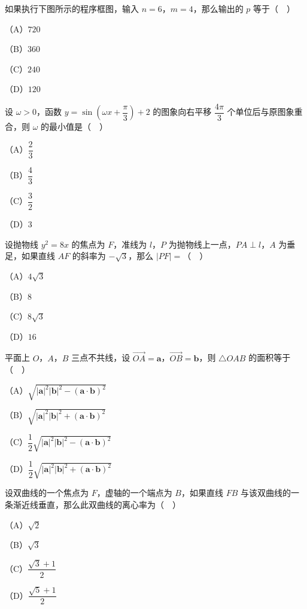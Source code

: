\begin{question}
如果执行下图所示的程序框图，输入 $n=6$，$m=4$，那么输出的 $p$ 等于（　）

（A）$720$

（B）$360$

（C）$240$

（D）$120$
\nopagebreak[4]
\begin{center}\end{center}
\nopagebreak[4]
\end{question}
\endgroup
\begin{question}
设 $\omega>0$，函数 $y=\sin\left(\omega x+\dfrac{\pi}{3}\right)+2$ 的图象向右平移 $\dfrac{4\pi}{3}$ 个单位后与原图象重合，则 $\omega$ 的最小值是（　）

（A）$\dfrac23$

（B）$\dfrac43$

（C）$\dfrac32$

（D）$3$

\end{question}
\begin{question}
设抛物线 $y^2=8x$ 的焦点为 $F$，准线为 $l$，$P$ 为抛物线上一点，$PA\perp l$，$A$ 为垂足，如果直线 $AF$ 的斜率为 $-\sqrt3$，那么 $|PF|=$（　）

（A）$4\sqrt3$

（B）$8$

（C）$8\sqrt3$

（D）$16$

\end{question}
\begin{question}
平面上 $O$，$A$，$B$ 三点不共线，设 $\overrightarrow{OA}=\boldsymbol a$，$\overrightarrow{OB}=\boldsymbol b$，则 $\triangle OAB$ 的面积等于（　）

（A）$\sqrt{|\boldsymbol a|^2|\boldsymbol b|^2-(\boldsymbol a\cdot\boldsymbol b)^2}$

（B）$\sqrt{|\boldsymbol a|^2|\boldsymbol b|^2+(\boldsymbol a\cdot\boldsymbol b)^2}$

（C）$\dfrac12\sqrt{|\boldsymbol a|^2|\boldsymbol b|^2-(\boldsymbol a\cdot\boldsymbol b)^2}$

（D）$\dfrac12\sqrt{|\boldsymbol a|^2|\boldsymbol b|^2+(\boldsymbol a\cdot\boldsymbol b)^2}$

\end{question}
\begin{question}
设双曲线的一个焦点为 $F$，虚轴的一个端点为 $B$，如果直线 $FB$ 与该双曲线的一条渐近线垂直，那么此双曲线的离心率为（　）

（A）$\sqrt2$

（B）$\sqrt3$

（C）$\dfrac{\sqrt3+1}{2}$

（D）$\dfrac{\sqrt5+1}{2}$

\end{question}
